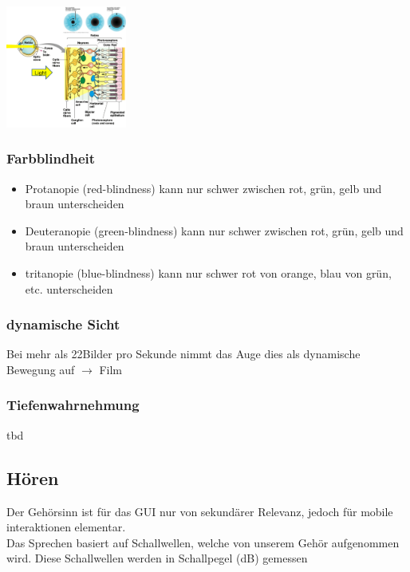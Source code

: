 \documentclass{report}
\newenvironment{Figure}
	{\par\medskip\noindent\minipage{\linewidth}}
	{\endminipage\par\medskip}
\theoremstyle{definition}
\theoremstyle{example}
\begin{document}
\begin{Figure}
   \centering
    \includegraphics[width=150px]{img/Retina.png}
        \label{fig:Abbildung der Netzhaut}
\end{Figure}

\subsubsection{Farbblindheit}
\begin{itemize}
   \item Protanopie (red-blindness)
   \subitem kann nur schwer zwischen rot, grün, gelb und braun unterscheiden 
   \item Deuteranopie (green-blindness)
   \subitem kann nur schwer zwischen rot, grün, gelb und braun unterscheiden 
   \item tritanopie (blue-blindness)
   \subitem kann nur schwer rot von orange, blau von grün, etc. unterscheiden 
\end{itemize}

\subsubsection{dynamische Sicht}
Bei mehr als 22Bilder pro Sekunde nimmt das Auge dies als dynamische Bewegung auf $\rightarrow$ Film

\subsubsection{Tiefenwahrnehmung}
tbd

\subsection{Hören}
Der Gehörsinn ist für das GUI nur von sekundärer Relevanz, jedoch für mobile interaktionen elementar. \\

Das Sprechen basiert auf Schallwellen, welche von unserem Gehör aufgenommen wird. Diese Schallwellen werden in Schallpegel (dB) gemessen
\end{document}
